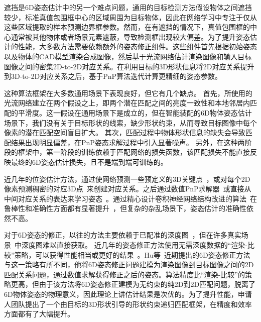 \documentclass[12pt]{article}
\begin{document}
遮挡是6D姿态估计中的另一个难点问题，通用的目标检测方法假设物体之间遮挡较少，标准真值包围框中心的区域周围为目标物体，因此在网络学习中专注于仅从这些区域提取的样本预测边界框参数。然而，在有遮挡的情况下，真值包围框的中心通常被其他物体或者场景元素遮蔽，导致检测框出现较大偏差。为了提升姿态估计的性能，大多数方法需要依赖额外的姿态修正组件。这些组件首先根据初始姿态以及物体的CAD模型渲染合成图像，然后基于光流网络估计渲染图像和输入目标图像之间的密集2D-to-2D对应关系。在利用目标的3D形状信息将2D对应关系提升到3D-to-2D对应关系之后，基于PnP算法迭代计算更精细的姿态参数。

这种算法框架在大多数通用场景下表现良好，但它有几个缺点。
首先，所使用的光流网络建立在两个假设之上，即两个潜在匹配之间的亮度一致性和本地邻居内匹配的平滑度。这一假设在通用场景下是成立的，但在智能装配的6D物体姿态估计场景下，我们没有关于目标形状的线索，缺少形状约束，从而导致目标图像中每个像素的潜在匹配空间盲目扩大。
其次，匹配过程中物体形状信息的缺失会导致匹配结果出现明显偏差，在PnP姿态求解过程中引入显著噪声。
另外，在这种两阶段的框架中，第一阶段的训练依赖于匹配网络的损失函数，该匹配损失不能直接反映最终的6D姿态估计损失，且不是端到端可训练的。

近几年的位姿估计方法，通过使网络预测一些预定义的3D关键点~\cite{rad2017bb8, hu2019segDriven, peng2019pvnet, Hu2021}，或对每个2D像素预测稠密的对应3D点~\cite{zakharov2019dpod, Su2022, li2019cdpn, wang2021gdrnet, Di2021}来创建对应关系。之后通过数值PnP求解器~\cite{lepetit2009epnp}或直接从中间对应关系的表达来学习姿态~\cite{hu2020singleStage, EroPnP,wang2021gdrnet, Di2021}。通过精心设计卷积神经网络结构改进的算法~\cite{he2016resnet, resnext_2017_cvpr}在鲁棒性和准确性方面都有显著提升~\cite{Xiang2018, peng2019pvnet, wang2019densefusion60}，但复杂的杂乱场景下，姿态估计的准确性依然不高。

对于6D姿态的修正，以往的方法主要依赖于已配准的深度图~\cite{Xiang2018, li2019cdpn, wang2019densefusion60}，但在许多真实场景~\cite{Hu2021}中深度图难以直接获取。
近几年的姿态修正方法使用无需深度数据的“渲染-比较”策略，可以获得性能相当或更好的结果~\cite{li2018deepim, zakharov2019dpod, cosypose, rad2017bb8, Hu2022, Lipson2022, RNNPose_2022_cvpr,Repose_2021_iccv}。Hu等~\cite{Hu2022}近期提出的6D姿态修正方法与这一策略有所不同，他将6D姿态修正问题建模为渲染图像到目标图像之间的2D匹配关系问题，通过数值求解获得修正之后的姿态。算法精度比“渲染-比较”的策略更高，但由于该方法将6D姿态修正建模为无约束的纯2D到2D匹配问题，脱离了6D物体姿态的物理意义，因此理论上讲估计结果是次优的。为了提升性能，申请人团队提出了一个由目标的3D形状引导的形状约束递归匹配框架，在精度和效率方面都有了大幅提升。
\end{document}
